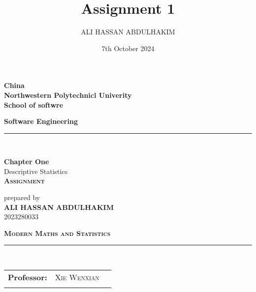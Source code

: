 \documentclass{article}
\title{Assignment 1}
\author{ALI HASSAN ABDULHAKIM }
\date{7th October 2024}
\begin{document}
\begin{titlepage}
	\newcommand{\HRule}{\rule{\linewidth}{0.35mm}} %
\begin{flushleft}
	{\scriptsize
		\textbf{\large{China}}\\
		\textbf{\large{Northwestern Polytechnicl Univerity}}\\
		\textbf{\large{School of softwre }}\\

		\textbf{\large{Software Engineering}}}
\end{flushleft}
\HRule \\[0.3cm]
	\begin{center}
		
		\textbf{\textbf{\huge{Chapter One}}}\\
		Descriptive Statistics\\
		\textbf{\textsc{\large{Assignment }}}\\
	\end{center}
	\begin{center}
		prepared by\\
		\textbf{{\large ALI HASSAN ABDULHAKIM}}\\
			\textsc{{\large 2023280033}}\\
		
	\end{center}
	\begin{center}
		\textbf{\textsc{\huge{ Modern Maths and  Statistics}}}\\
		
		\HRule \\%
	\end{center}
	
	\begin{center}
		\begin{tabular}{lll}
			\textbf{Professor:}  & \textsc{Xie Wenxian} 
			\tabularnewline
			\tabularnewline
			
		\end{tabular}
	\end{center}
	\sloppy
\end{titlepage}
\end{document}
